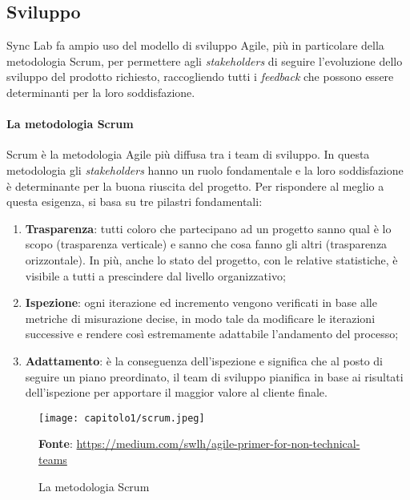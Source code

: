 \subsection{Sviluppo}
Sync Lab fa ampio uso del modello di sviluppo Agile, più in particolare della metodologia Scrum, per permettere agli \textit{stakeholders} di seguire l'evoluzione dello sviluppo del prodotto richiesto, raccogliendo tutti i \textit{feedback} che possono essere determinanti per la loro soddisfazione. 

\paragraph{La metodologia Scrum}
Scrum è la metodologia Agile più diffusa tra i team di sviluppo. In questa metodologia gli \textit{stakeholders} hanno un ruolo fondamentale e la loro soddisfazione è determinante per la buona riuscita del progetto. Per rispondere al meglio a questa esigenza, si basa su tre pilastri fondamentali:
\begin{enumerate}
  \item \textbf{Trasparenza}: tutti coloro che partecipano ad un progetto sanno qual è lo scopo (trasparenza verticale) e sanno che cosa fanno gli altri (trasparenza orizzontale). In più, anche lo stato del progetto, con le relative statistiche, è visibile a tutti a prescindere dal livello organizzativo;
  \item \textbf{Ispezione}: ogni iterazione ed incremento vengono verificati in base alle metriche di misurazione decise, in modo tale da modificare le iterazioni successive e rendere così estremamente adattabile l'andamento del processo;
  \item \textbf{Adattamento}: è la conseguenza dell'ispezione e significa che al posto di seguire un piano preordinato, il team di sviluppo pianifica in base ai risultati dell'ispezione per apportare il maggior valore al cliente finale.
\end{enumerate}

\clearpage

\begin{figure}[h!]
  \centering
  \texttt{[image: capitolo1/scrum.jpeg]}
  \caption{La metodologia Scrum}
  \textbf{Fonte}: \href{https://medium.com/swlh/agile-primer-for-non-technical-teams-1deb06968281}{https://medium.com/swlh/agile-primer-for-non-technical-teams}
\end{figure}

